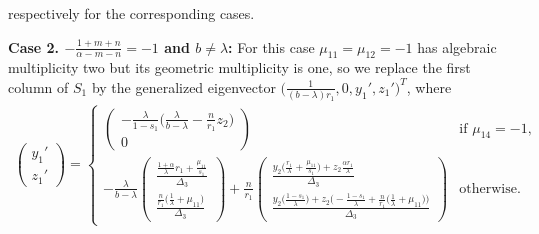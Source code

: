 \documentclass[11pt]{article}
\theoremstyle{remark}
\begin{document}
respectively for the corresponding cases.

{\bf Case 2. $-\frac{1+m+n}{\alpha-m-n}= -1$ and $b\ne\lambda$: }
For this case $\mu_{11} = \mu_{12} = -1$ has algebraic multiplicity two but its geometric multiplicity is one, so we replace the first column of $S_1$ by the generalized eigenvector
$\big(\frac{1}{(b-\lambda)r_1}, 0, y_1', z_1'\big)^T$, where
\begin{equation} \label{eq:S1-2}
\begin{aligned}
\begin{pmatrix}
 y_1'\\z_1'
\end{pmatrix}
=\begin{cases}
  \begin{pmatrix}
  -\frac{\lambda}{1-s_1}\big(\frac{\lambda}{b-\lambda} -\frac{n}{r_1}z_2\big)\\0
  \end{pmatrix} & \text{if $\mu_{14}=-1$,}\\
  -\frac{\lambda}{b-\lambda}
  \begin{pmatrix}
  \frac{ \frac{1+\alpha}{\lambda}r_1 + \frac{\mu_{11}}{s_1} }{ \Delta_3 }\\
  \frac{ \frac{n}{r_1}\big(\frac{1}{\lambda} + \mu_{11}\big) }{ \Delta_3 }
  \end{pmatrix} +
  \frac{n}{r_1}
  \begin{pmatrix}
  \frac{ y_2\big(\frac{r_1}{\lambda} + \frac{\mu_{11}}{s_1}\big) + z_2\frac{\alpha r_1}{\lambda} }{ \Delta_3 }\\
  \frac{ y_2\big(\frac{1-s_1}{\lambda}\big) + z_2\big(-\frac{1-s_1}{\lambda}+\frac{n}{r_1}\big(\frac{1}{\lambda}+\mu_{11}\big)\big) }{ \Delta_3 }
  \end{pmatrix} & \text{otherwise.}
 \end{cases}
\end{aligned}
\end{equation}
\end{document}
